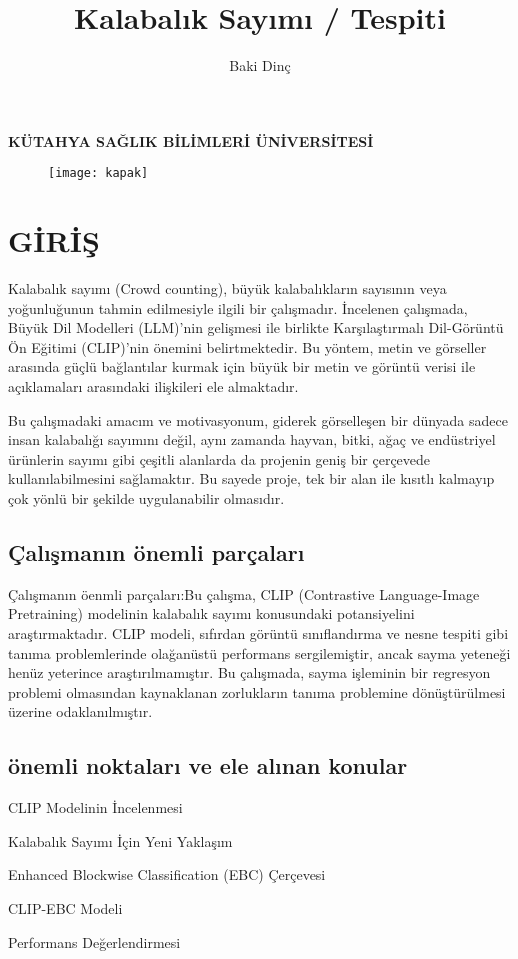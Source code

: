 \documentclass[10pt,a4paper]{report}
\title{Kalabalık Sayımı / Tespiti}
\author{Baki Dinç}
\begin{document}
	\textbf{KÜTAHYA SAĞLIK BİLİMLERİ ÜNİVERSİTESİ}\centering
	\begin{figure}[!h]
		\centering
		\texttt{[image: kapak]}
		\caption*{\cite{kapakfoto}}
		\maketitle
	\end{figure}
	\clearpage

	\tableofcontents
	\clearpage
	\raggedright \section{GİRİŞ}
	
\begin{justify}
Kalabalık sayımı (Crowd counting), büyük kalabalıkların sayısının veya yoğunluğunun tahmin edilmesiyle ilgili bir çalışmadır. İncelenen çalışmada, Büyük Dil Modelleri (LLM)'nin gelişmesi ile birlikte Karşılaştırmalı Dil-Görüntü Ön Eğitimi (CLIP)'nin önemini belirtmektedir. Bu yöntem, metin ve görseller arasında güçlü bağlantılar kurmak için büyük bir metin ve görüntü verisi ile açıklamaları arasındaki ilişkileri ele almaktadır.\newline  


Bu çalışmadaki amacım ve motivasyonum, giderek görselleşen bir dünyada sadece insan kalabalığı sayımını değil, aynı zamanda hayvan, bitki, ağaç ve endüstriyel ürünlerin sayımı gibi çeşitli alanlarda da projenin geniş bir çerçevede kullanılabilmesini sağlamaktır. Bu sayede proje, tek bir alan ile kısıtlı kalmayıp çok yönlü bir şekilde uygulanabilir olmasıdır.

\subsection{ {Çalışmanın önemli parçaları}}Çalışmanın öenmli parçaları:Bu çalışma, CLIP (Contrastive Language-Image Pretraining) modelinin kalabalık sayımı konusundaki potansiyelini araştırmaktadır. CLIP modeli, sıfırdan görüntü sınıflandırma ve nesne tespiti gibi tanıma problemlerinde olağanüstü performans sergilemiştir, ancak sayma yeteneği henüz yeterince araştırılmamıştır. Bu çalışmada, sayma işleminin bir regresyon problemi olmasından kaynaklanan zorlukların tanıma problemine dönüştürülmesi üzerine odaklanılmıştır\cite{ma2024clip}.\newline


\subsection{{önemli noktaları ve ele alınan konular}}
\item  CLIP Modelinin İncelenmesi
\item Kalabalık Sayımı İçin Yeni Yaklaşım
\item Enhanced Blockwise Classification (EBC) Çerçevesi
\item CLIP-EBC Modeli
\item Performans Değerlendirmesi

\end{justify}
\clearpage
\end{document}
